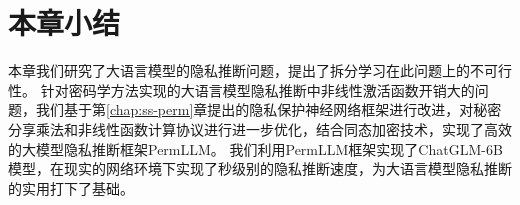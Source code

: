\section{本章小结}
本章我们研究了大语言模型的隐私推断问题，提出了拆分学习在此问题上的不可行性。
%
针对密码学方法实现的大语言模型隐私推断中非线性激活函数开销大的问题，我们基于第\ref{chap:ss-perm}章提出的隐私保护神经网络框架进行改进，对秘密分享乘法和非线性函数计算协议进行进一步优化，结合同态加密技术，实现了高效的大模型隐私推断框架PermLLM。
%
我们利用PermLLM框架实现了ChatGLM-6B模型，在现实的网络环境下实现了秒级别的隐私推断速度，为大语言模型隐私推断的实用打下了基础。
